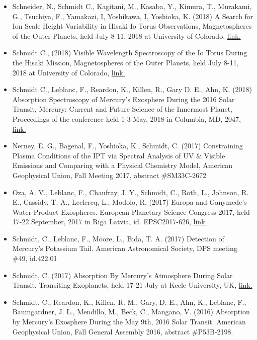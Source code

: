 \documentclass[12pt]{report}
\begin{document}
\begin{itemize}
   \item Schneider, N., Schmidt C., Kagitani, M., Kasaba, Y., Kimura, T., Murakami, G., Tsuchiya, F., Yamakazi, I, Yoshikawa, I, Yoshioka, K. (2018) A Search for Ion Scale Height Variability in Hisaki Io Torus Observations, Magnetospheres of the Outer Planets, held July 8-11, 2018 at University of Colorado, \href{https://lasp.colorado.edu/home/mop/files/2018/07/Mop2018-Program-Online-PDF-A-Version-No-Covers.pdf/}{link.} 
   \item Schmidt C., (2018) Visible Wavelength Spectroscopy of the Io Torus During the Hisaki Mission, Magnetospheres of the Outer Planets, held July 8-11, 2018 at University of Colorado, \href{https://lasp.colorado.edu/home/mop/files/2018/07/Mop2018-Program-Online-PDF-A-Version-No-Covers.pdf/}{link.} 
   \item Schmidt C., Leblanc, F., Reardon, K., Killen, R., Gary D. E., Ahn, K. (2018) Absorption Spectroscopy of Mercury's Exosphere During the 2016 Solar Transit, Mercury: Current and Future Science of the Innermost Planet, Proceedings of the conference held 1-3 May, 2018 in Columbia, MD, 2047, \href{https://www.hou.usra.edu/meetings/mercury2018/pdf/6022.pdf}{link.} 
   \item Nerney, E. G., Bagenal, F., Yoshioka, K., Schmidt, C. (2017) Constraining Plasma Conditions of the IPT via Spectral Analysis of UV \& Visible Emissions and Comparing with a Physical Chemistry Model, American Geophysical Union, Fall Meeting 2017, abstract \#SM33C-2672
   \item Oza, A. V., Leblanc, F., Chaufray, J. Y., Schmidt, C., Roth, L., Johnson, R. E., Cassidy, T. A., Leclercq, L., Modolo, R. (2017) Europa and Ganymede's Water-Product Exospheres. European Planetary Science Congress 2017, held 17-22 September, 2017 in Riga Latvia, id. EPSC2017-626, \href{https://meetingorganizer.copernicus.org/EPSC2017/EPSC2017-626-1.pdf}{link.} 
   \item Schmidt, C., Leblanc, F., Moore, L., Bida, T. A. (2017) Detection of Mercury's Potassium Tail. American Astronomical Society, DPS meeting \#49, id.422.01
   \item Schmidt, C. (2017) Absorption By Mercury's Atmosphere During Solar Transit. Transiting Exoplanets, held 17-21 July at Keele University, UK, \href{https://wasp-planets.net/conference/talk-abstracts/#44}{link.} 
   \item Schmidt, C., Reardon, K., Killen, R. M., Gary, D. E., Ahn, K., Leblanc, F., Baumgardner, J. L., Mendillo, M., Beck, C., Mangano, V. (2016) Absorption by Mercury's Exosphere During the May 9th, 2016 Solar Transit. American Geophysical Union, Fall General Assembly 2016, abstract \#P53B-2198.

\end{itemize}
\end{document}
